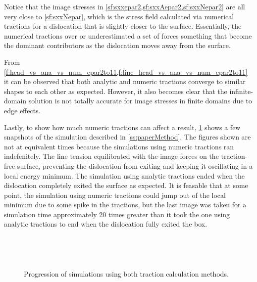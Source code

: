 Notice that the image stresses in \cref{sf:sxxepar2,sf:sxxAepar2,sf:sxxNepar2} are all very close to \cref{sf:sxxNepar}, which is the stress field calculated via numerical tractions for a dislocation that is slightly closer to the surface. Essentially, the numerical tractions over or underestimated a set of forces something that become the dominant contributors as the dislocation moves away from the surface.

From \cref{f:head_vs_ana_vs_num_epar2to11,f:line_head_vs_ana_vs_num_epar2to11} it can be observed that both analytic and numeric tractions converge to similar shapes to each other as expected. However, it also becomes clear that the infinite-domain solution is not totally accurate for image stresses in finite domains due to edge effects.

Lastly, to show how much numeric tractions can affect a result, \cref{f:simulation} shows a few snapshots of the simulation described in \cref{ss:paperMethod}. The figures shown are not at equivalent times because the simulations using numeric tractions ran indefenitely. The line tension equilibrated with the image forces on the traction-free surface, preventing the dislocation from exiting and keeping it oscillating in a local energy minimum. The simulation using analytic tractions ended when the dislocation completely exited the surface as expected. It is feasable that at some point, the simulation using numeric tractions could jump out of the local minimum due to some spike in the tractions, but the last image was taken for a simulation time approximately 20 times greater than it took the one using analytic tractions to end when the dislocation fully exited the box.
\begin{figure}
    ~
    ~

    ~
    ~
    \caption[Unloaded simulations using analytic and numeric tractions.]{Progression of simulations using both traction calculation methods.}
    \label{f:simulation}
\end{figure}

